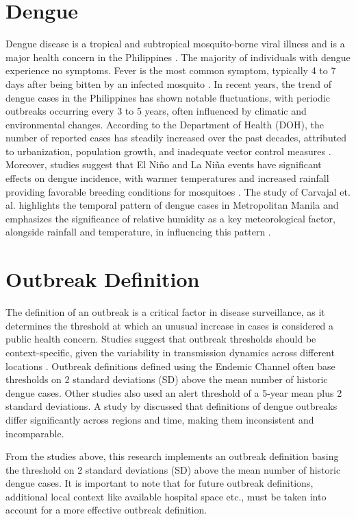 \section{Dengue}
Dengue disease is a tropical and subtropical mosquito-borne viral illness and is a major health concern in the Philippines \cite{bravo2014epidemiology}. The majority of individuals with dengue experience no symptoms. Fever is the most common symptom, typically 4 to 7 days after being bitten by an infected mosquito \cite{zhou2024dengue}. In recent years, the trend of dengue cases in the Philippines has shown notable fluctuations, with periodic outbreaks occurring every 3 to 5 years, often influenced by climatic and environmental changes. According to the Department of Health (DOH), the number of reported cases has steadily increased over the past decades, attributed to urbanization, population growth, and inadequate vector control measures \cite{who2018philippines}. Moreover, studies suggest that El Niño and La Niña events have significant effects on dengue incidence, with warmer temperatures and increased rainfall providing favorable breeding conditions for mosquitoes \cite{watts2020climate}. The study of Carvajal et. al. highlights the temporal pattern of dengue cases in Metropolitan Manila and emphasizes the significance of relative humidity as a key meteorological factor, alongside rainfall and temperature, in influencing this pattern \cite{carvajal2018machine}.

\section{Outbreak Definition}
The definition of an outbreak is a critical factor in disease surveillance, as it determines the threshold at which an unusual increase in cases is considered a public health concern. Studies suggest that outbreak thresholds should be context-specific, given the variability in transmission dynamics across different locations \cite{runge2016dengue}. Outbreak definitions defined using the Endemic Channel often base thresholds on 2 standard deviations (SD) above the mean number of historic dengue cases. Other studies \cite{hemisphere2015update} also used an alert threshold of a 5-year mean plus 2 standard deviations. A study by \cite{brady2015dengue} discussed that definitions of dengue outbreaks differ significantly across regions and time, making them inconsistent and incomparable.

From the studies above, this research implements an outbreak definition basing the threshold on 2 standard deviations (SD) above the mean number of historic dengue cases. It is important to note that for future outbreak definitions, additional local context like available hospital space etc., must be taken into account for a more effective outbreak definition.


